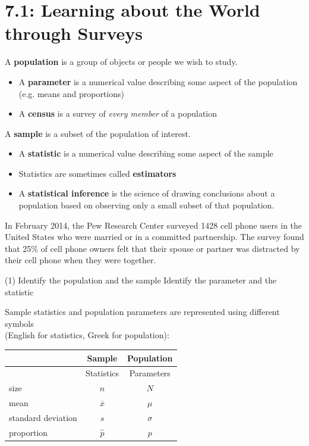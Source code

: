 \documentclass[../mathNotesPreamble]{subfiles}
\providecommand{\relscalefact}{1.4}
\begin{document}
\relscale{\relscalefact}
  \section{7.1: Learning about the World through Surveys}

    \begin{defn*}
      A \textbf{population} is a group of objects or people we wish to study.
      \begin{itemize}
        \item A \textbf{parameter} is a numerical value describing some aspect of the population\\ (e.g. means and proportions)
        \item A \textbf{census} is a survey of \emph{every member} of a population
      \end{itemize}
      A \textbf{sample} is a subset of the population of interest.
      \begin{itemize}
        \item A \textbf{statistic} is a numerical value describing some aspect of the sample
        \item Statistics are sometimes called \textbf{estimators}
        \item A \textbf{statistical inference} is the science of drawing conclusions about a population based on observing only a small subset of that population.
      \end{itemize}
    \end{defn*}

    \begin{ex*}
      In February 2014, the Pew Research Center surveyed 1428 cell phone users in the United States who were married or in a committed partnership. The survey found that 25\% of cell phone owners felt that their spouse or partner was distracted by their cell phone when they were together.
    \end{ex*}

    \begin{extasks}[after-item-skip=\stretch{1}](1)
      \task Identify the population and the sample
      \task Identify the parameter and the statistic
    \end{extasks}
    \pagebreak

    \noindent
    Sample statistics and population parameters are represented using different symbols\\ (English for statistics, Greek for population):
    \begin{center}
      \begin{tabular}{@{}l*{2}{c}@{}}
        & Sample& Population\\\toprule
        & Statistics & Parameters \\\midrule
        size & $n$& $N$\\
        mean & $\overline{x}$ & $\mu$ \\
        standard deviation & $s$ & $\sigma$\\
        proportion & $\hat{p}$ & $p$\\\bottomrule
      \end{tabular}
    \end{center}
\end{document}
